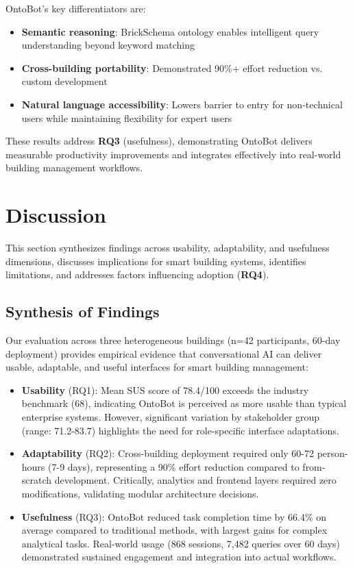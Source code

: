 \documentclass[acmlarge]{acmart}
\begin{document}
OntoBot's key differentiators are:
\begin{itemize}
    \item \textbf{Semantic reasoning}: BrickSchema ontology enables intelligent query understanding beyond keyword matching
    \item \textbf{Cross-building portability}: Demonstrated 90\%+ effort reduction vs. custom development
    \item \textbf{Natural language accessibility}: Lowers barrier to entry for non-technical users while maintaining flexibility for expert users
\end{itemize}

These results address \textbf{RQ3} (usefulness), demonstrating OntoBot delivers measurable productivity improvements and integrates effectively into real-world building management workflows.

\section{Discussion}

This section synthesizes findings across usability, adaptability, and usefulness dimensions, discusses implications for smart building systems, identifies limitations, and addresses factors influencing adoption (\textbf{RQ4}).

\subsection{Synthesis of Findings}

Our evaluation across three heterogeneous buildings (n=42 participants, 60-day deployment) provides empirical evidence that conversational AI can deliver usable, adaptable, and useful interfaces for smart building management:

\begin{itemize}
    \item \textbf{Usability} (RQ1): Mean SUS score of 78.4/100 exceeds the industry benchmark (68), indicating OntoBot is perceived as more usable than typical enterprise systems. However, significant variation by stakeholder group (range: 71.2-83.7) highlights the need for role-specific interface adaptations.
    
    \item \textbf{Adaptability} (RQ2): Cross-building deployment required only 60-72 person-hours (7-9 days), representing a 90\% effort reduction compared to from-scratch development. Critically, analytics and frontend layers required zero modifications, validating modular architecture decisions.
    
    \item \textbf{Usefulness} (RQ3): OntoBot reduced task completion time by 66.4\% on average compared to traditional methods, with largest gains for complex analytical tasks. Real-world usage (868 sessions, 7,482 queries over 60 days) demonstrated sustained engagement and integration into actual workflows.
\end{itemize}
\end{document}
